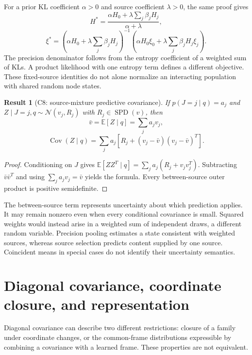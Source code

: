 \documentclass[11pt]{article}
\newtheorem{result}{Result}
\newcommand{\E}{\mathbb{E}}
\newcommand{\SPD}{\operatorname{SPD}}
\newcommand{\Cov}{\operatorname{Cov}}
\begin{document}
For a prior KL coefficient $\alpha>0$ and source coefficient $\lambda>0$, the same proof gives
\begin{equation}
H^*=\frac{\alpha H_0+\lambda\sum_j\beta_jH_j}{\alpha+\lambda},
\end{equation}
\begin{equation}
\xi^*=\left(\alpha H_0+\lambda\sum_j\beta_jH_j\right)^{-1}
\left(\alpha H_0\xi_0+\lambda\sum_j\beta_jH_j\xi_j\right).
\label{eq:prior-pool}
\end{equation}
The precision denominator follows from the entropy coefficient of a weighted sum of KLs. A product likelihood with one entropy term defines a different objective. These fixed-source identities do not alone normalize an interacting population with shared random node states.

\begin{result}[C8: source-mixture predictive covariance]
\label{res:C8}
If $p(J=j\mid q)=a_j$ and $Z\mid J=j,q\sim\mathcal N(v_j,R_j)$ with $R_j\in\SPD(v)$, then
\begin{equation}
\bar v=\E[Z\mid q]=\sum_ja_jv_j,
\end{equation}
\begin{equation}
\Cov(Z\mid q)=\sum_ja_j\left[R_j+(v_j-\bar v)(v_j-\bar v)^T\right].
\label{eq:mixture-covariance}
\end{equation}
\end{result}
\begin{proof}
Conditioning on $J$ gives $\E[ZZ^T\mid q]=\sum_ja_j(R_j+v_jv_j^T)$. Subtracting $\bar v\bar v^T$ and using $\sum_ja_jv_j=\bar v$ yields the formula. Every between-source outer product is positive semidefinite.
\end{proof}

The between-source term represents uncertainty about which prediction applies. It may remain nonzero even when every conditional covariance is small. Squared weights would instead arise in a weighted sum of independent draws, a different random variable. Precision pooling estimates a state consistent with weighted sources, whereas source selection predicts content supplied by one source. Coincident means in special cases do not identify their uncertainty semantics.

\section{Diagonal covariance, coordinate closure, and representation}
\label{sec:diagonal}
Diagonal covariance can describe two different restrictions: closure of a family under coordinate changes, or the common-frame distributions expressible by combining a covariance with a learned frame. These properties are not equivalent.
\end{document}
